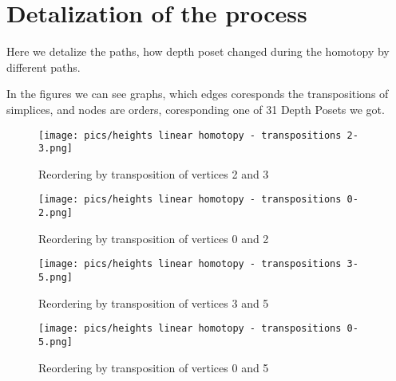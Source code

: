 \documentclass{article}
\begin{document}
\section{Detalization of the process}
\par Here we detalize the paths, how depth poset changed during the homotopy by different paths.
\par In the figures we can see graphs, which edges coresponds the transpositions of simplices, and nodes are orders, coresponding one of 31 Depth Posets we got.
\begin{figure}[htbp]
    \centering
    \texttt{[image: pics/heights linear homotopy - transpositions 2-3.png]}
    \caption{Reordering by transposition of vertices 2 and 3}
    \label{fig:transposition2and3}
\end{figure}
\begin{figure}[htbp]
    \centering
    \texttt{[image: pics/heights linear homotopy - transpositions 0-2.png]}
    \caption{Reordering by transposition of vertices 0 and 2}
    \label{fig:transposition0and2}
\end{figure}
\begin{figure}[htbp]
    \centering
    \texttt{[image: pics/heights linear homotopy - transpositions 3-5.png]}
    \caption{Reordering by transposition of vertices 3 and 5}
    \label{fig:transposition3and5}
\end{figure}
\begin{figure}[htbp]
    \centering
    \texttt{[image: pics/heights linear homotopy - transpositions 0-5.png]}
    \caption{Reordering by transposition of vertices 0 and 5}
    \label{fig:transposition0and5}
\end{figure}
\end{document}
